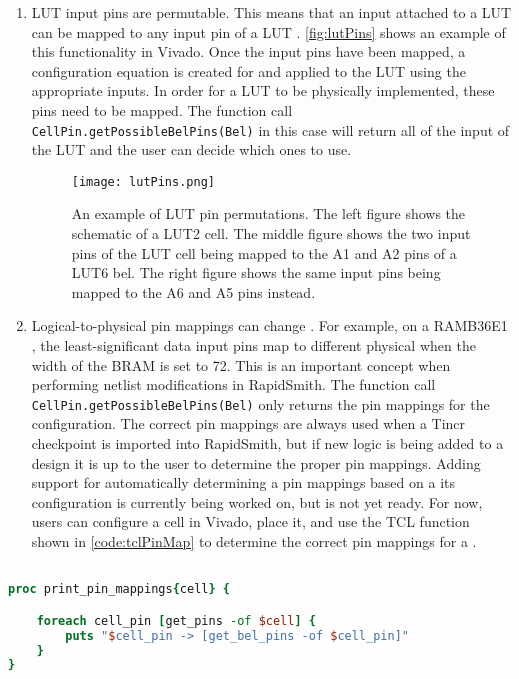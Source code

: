 \begin {enumerate}
  \item LUT input pins are permutable. This means that an input \cellpin 
  attached to a LUT \cell can be mapped to any input pin of a LUT \bel.
  \autoref{fig:lutPins} shows an example of this functionality in Vivado. Once
  the input pins have been mapped, a configuration equation is created for and
  applied to the LUT \bel using the appropriate \belpin inputs.
  In order for a LUT \cell to be physically implemented, these pins need to be
  mapped. The function call \texttt{CellPin.getPossibleBelPins(Bel)} in this
  case will return all of the input \belpins of the LUT and the user can decide
  which ones to use.
  
  \begin{figure}[t]
	\centering
	\texttt{[image: lutPins.png]}
	\caption{An example of LUT pin permutations. The left figure shows the
	schematic of a LUT2 cell. The middle figure shows the two input pins of the LUT
	cell being mapped to the A1 and A2 pins of a LUT6 bel. The right figure shows
	the same input pins being mapped to the A6 and A5 pins instead.}
	\label{fig:lutPins}
  \end{figure}
  
  \item Logical-to-physical pin mappings can change . For example, on a RAMB36E1 \cell, the least-significant data
  input pins map to different physical \belpins when the width of the BRAM is
  set to 72. This is an important concept when performing netlist modifications
  in RapidSmith. The function call \texttt{CellPin.getPossibleBelPins(Bel)} only
  returns the pin mappings for the  \cell configuration. The
  correct pin mappings are always used when a Tincr checkpoint is imported into
  RapidSmith, but if new logic is being added to a design it is up to the
  user to determine the proper pin mappings. Adding support for
  automatically determining a \cells pin mappings based on a its
  configuration is currently being worked on, but is not yet ready. For now,
  users can configure a cell in Vivado, place it, and use the TCL function shown
  in \autoref{code:tclPinMap} to determine the correct pin mappings for a \cell.

\end{enumerate}

\begin{lstlisting}[language=tcl, caption=TCL script to print all
logical-to-physical pin mappings of a cell,label=code:tclPinMap]

proc print_pin_mappings{cell} {

	foreach cell_pin [get_pins -of $cell] {
		puts "$cell_pin -> [get_bel_pins -of $cell_pin]" 
	}
}

\end{lstlisting}
 
